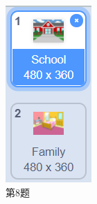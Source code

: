 \documentclass[10pt, a4paper]{article}
\begin{document}
\begin{enumerate}
\begin{figure}[htbp]
\begin{minipage}[t]{.07\textwidth}
                \includegraphics[width=\textwidth]{8.png}
                \caption*{第8题}
            \end{minipage}
            \begin{minipage}[t]{.18\textwidth}

\end{minipage}
\end{figure}
\end{enumerate}
\end{document}
